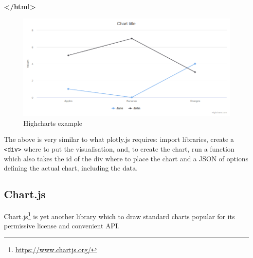 \documentclass[
]{krantz}
\makeatletter
\newenvironment{Shaded}{\begin{snugshade}}{\end{snugshade}}
\newcommand{\KeywordTok}[1]{\textcolor[rgb]{0.27,0.27,0.27}{\textbf{#1}}}
\renewcommand{\href}[2]{#2\footnote{\url{#1}}}
\newenvironment{kframe}{%
\medskip{}
\setlength{\fboxsep}{.8em}
 \def\at@end@of@kframe{}%
 \ifinner\ifhmode%
  \def\at@end@of@kframe{\end{minipage}}%
  \begin{minipage}{\columnwidth}%
 \fi\fi%
 \def\FrameCommand##1{\hskip\@totalleftmargin \hskip-\fboxsep
 \colorbox{shadecolor}{##1}\hskip-\fboxsep
     \hskip-\linewidth \hskip-\@totalleftmargin \hskip\columnwidth}%
 \MakeFramed {\advance\hsize-\width
   \@totalleftmargin\z@ \linewidth\hsize
   \@setminipage}}%
 {\par\unskip\endMakeFramed%
 \at@end@of@kframe}
\renewenvironment{Shaded}{\begin{kframe}}{\end{kframe}}
\makeatother
\begin{document}
\begin{Shaded}
\begin{Highlighting}[]
\KeywordTok{\textless{}/html\textgreater{}}
\end{Highlighting}
\end{Shaded}

\begin{figure}
\centering
\includegraphics{images/candidate-highcharts.png}
\caption{Highcharts example}
\end{figure}

The above is very similar to what plotly.js requires: import libraries, create a \texttt{\textless{}div\textgreater{}} where to put the visualisation, and, to create the chart, run a function which also takes the id of the div where to place the chart and a JSON of options defining the actual chart, including the data.

\hypertarget{chart.js}{%
\subsection*{Chart.js}\label{chart.js}}


\href{https://www.chartjs.org/}{Chart.js} is yet another library which to draw standard charts popular for its permissive license and convenient API.
\end{document}
